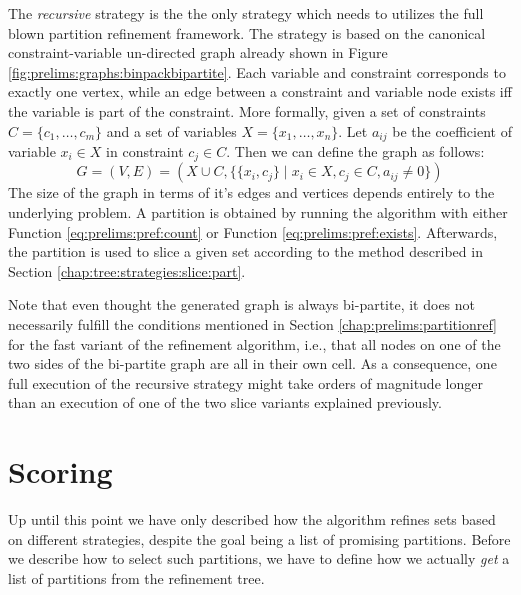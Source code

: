 			The \textit{recursive} strategy is the the only strategy which needs to utilizes the full blown partition refinement framework.
			The strategy is based on the canonical constraint-variable un-directed graph already shown in Figure \ref{fig:prelims:graphs:binpackbipartite}.
			Each variable and constraint corresponds to exactly one vertex, while an edge between a constraint and variable node exists iff the variable is part of the constraint.
			More formally, given a set of constraints $C = \{ c_1, \ldots, c_m \}$ and a set of variables $X = \{ x_1, \ldots, x_n \}$. Let $a_{ij}$ be the coefficient of variable $x_i \in X$ in constraint $c_j \in C$.
			Then we can define the graph as follows:
			\begin{equation*}
				G = (V, E) = (X \cup C, \{ \{ x_i, c_j \} \mid x_i \in X, c_j \in C, a_{ij} \neq 0 \})
			\end{equation*}
			The size of the graph in terms of it's edges and vertices depends entirely to the underlying problem. 
			A partition is obtained by running the algorithm with either Function \ref{eq:prelims:pref:count} or Function \ref{eq:prelims:pref:exists}.
			Afterwards, the partition is used to slice a given set according to the method described in Section \ref{chap:tree:strategies:slice:part}.
			
			Note that even thought the generated graph is always bi-partite, it does not necessarily fulfill the conditions mentioned in Section \ref{chap:prelims:partitionref} for the fast variant of the refinement algorithm, i.e., that all nodes on one of the two sides of the bi-partite graph are all in their own cell.
			As a consequence, one full execution of the recursive strategy might take orders of magnitude longer than an execution of one of the two slice variants explained previously. 
			
			\clearpage
	
	\section{Scoring}
	
		Up until this point we have only described how the algorithm refines sets based on different strategies, despite the goal being a list of promising partitions.
		Before we describe how to select such partitions, we have to define how we actually \textit{get} a list of partitions from the refinement tree.
		
